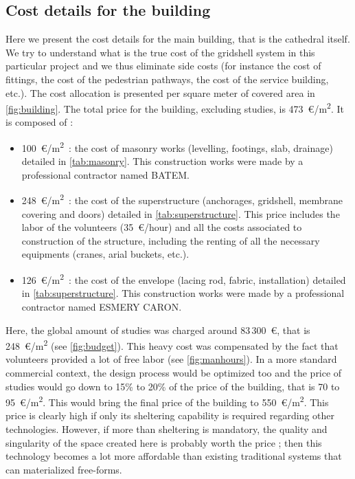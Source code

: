 \subsection{Cost details for the building}\label{sec=gs_cost}
Here we present the cost details for the main building, that is the cathedral itself. We try to understand what is the true cost of the gridshell system in this particular project and we thus eliminate side costs (for instance the cost of fittings, the cost of the pedestrian pathways, the cost of the service building, etc.). The cost allocation is presented per square meter of covered area in \cref{fig:building}. The total price for the building, excluding studies, is 473~€/m\textsuperscript{2}. It is composed of :
\begin{itemize}
\item  100~€/m\textsuperscript{2}~: the cost of masonry works (levelling, footings, slab, drainage) detailed in \cref{tab:masonry}. This construction works were made by a professional contractor named BATEM.
\item  248~€/m\textsuperscript{2}~: the cost of the superstructure (anchorages, gridshell, membrane covering and doors) detailed in \cref{tab:superstructure}. This price includes the labor of the volunteers (35~€/hour) and all the costs associated to construction of the structure, including the renting of all the necessary equipments (cranes, arial buckets, etc.).
\item  126~€/m\textsuperscript{2}~: the cost of the envelope (lacing rod, fabric, installation) detailed in \cref{tab:superstructure}. This construction works were made by a professional contractor named ESMERY CARON.
\end{itemize}

Here, the global amount of studies was charged around 83\,300~€, that is 248~€/m\textsuperscript{2} (see \cref{fig:budget}). This heavy cost was compensated by the fact that volunteers provided a lot of free labor (see \cref{fig:manhours}). In a more standard commercial context, the design process would be optimized too and the price of studies would go down to 15\% to 20\% of the price of the building, that is 70 to 95~€/m\textsuperscript{2}. This would bring the final price of the building to 550~€/m\textsuperscript{2}. This price is clearly high if only its sheltering capability is required regarding other technologies. However, if more than sheltering is mandatory, the quality and singularity of the space created here is probably worth the price ; then this technology becomes a lot more affordable than existing traditional systems that can materialized free-forms.

